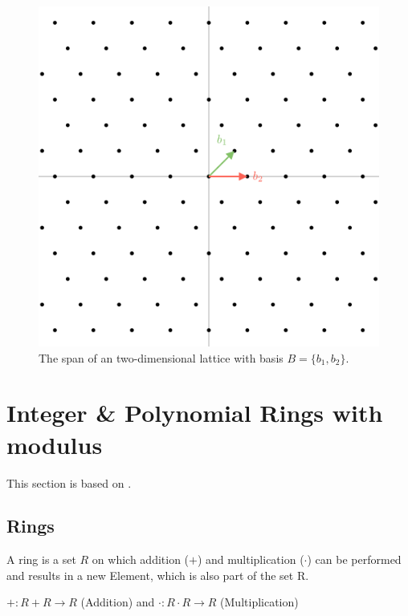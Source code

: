 \begin{figure}[ht]
  \centering
  \includegraphics[scale=0.2]{images/LatticeGrid.png}
  \caption[Span of an Lattice]{The span of an two-dimensional lattice with basis  $B = \{b_1, b_2\}$.}
  \label{fig:latticeGrid}
\end{figure}



\section{Integer \& Polynomial Rings with modulus}
This section is based on \cite{Algebra}.

\subsection*{Rings}
A ring is a set $R$ on which addition ($+$) and multiplication ($\cdot$) can be performed and results in a new Element, which is also part of the set R.
\begin{center}
  $ +: R+R\rightarrow R$ (Addition) and $\cdot: R \cdot R \rightarrow R$ (Multiplication)
\end{center}


